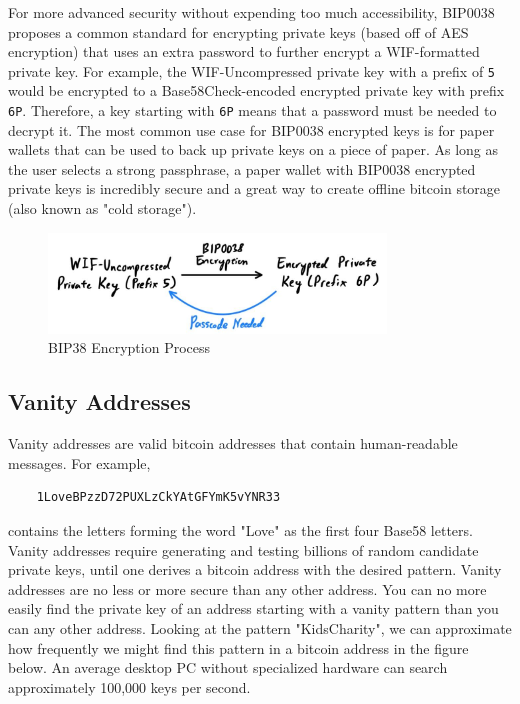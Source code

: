 \documentclass{article}
\begin{document}
    For more advanced security without expending too much accessibility, BIP0038 proposes a common standard for encrypting private keys (based off of AES encryption) that uses an extra password to further encrypt a WIF-formatted private key. For example, the WIF-Uncompressed private key with a prefix of \texttt{5} would be encrypted to a Base58Check-encoded encrypted private key with prefix \texttt{6P}. Therefore, a key starting with \texttt{6P} means that a password must be needed to decrypt it. The most common use case for BIP0038 encrypted keys is for paper wallets that can be used to back up private keys on a piece of paper. As long as the user selects a strong passphrase, a paper wallet with BIP0038 encrypted private keys is incredibly secure and a great way to create offline bitcoin storage (also known as "cold storage").

    \begin{figure}[H]
    \centering
    \includegraphics[width=0.8\textwidth]{img/BIP38_Encryption.jpg}
    \caption{BIP38 Encryption Process}
    \end{figure}

  \subsection{Vanity Addresses}

    Vanity addresses are valid bitcoin addresses that contain human-readable messages. For example,

    \begin{lstlisting}
    1LoveBPzzD72PUXLzCkYAtGFYmK5vYNR33
    \end{lstlisting}

    contains the letters forming the word "Love" as the first four Base58 letters. Vanity addresses require generating and testing billions of random candidate private keys, until one derives a bitcoin address with the desired pattern. Vanity addresses are no less or more secure than any other address. You can no more easily find the private key of an address starting with a vanity pattern than you can any other address. Looking at the pattern "KidsCharity", we can approximate how frequently we might find this pattern in a bitcoin address in the figure below. An average desktop PC without specialized hardware can search approximately 100,000 keys per second.
\end{document}
